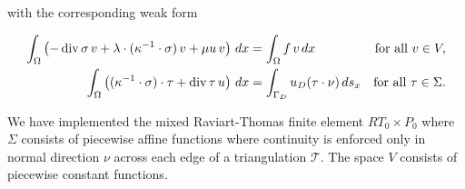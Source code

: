 with the corresponding weak form

\begin{align}
\label{sect:FEMForEllipticProblems.eq.mixedWeakForm}
  \int_\Omega \left( -\operatorname{div}\sigma\,v + \lambda\cdot(\kappa^{-1}\cdot\sigma)\,v + \mu u\,v\right)\,dx &= \int_\Omega f\,v\,dx &\text{for all } v\in V, \\
  \int_\Omega \left((\kappa^{-1}\cdot\sigma)\cdot\tau + \operatorname{div}\tau\, u\right)\,dx &= \int_{\Gamma_D} u_D(\tau\cdot\nu)\,ds_x &\text{for all } \tau\in\Sigma.
\end{align}

\bigskip

We have implemented the mixed Raviart-Thomas finite element $RT_0\times P_0$ where $\Sigma$ consists of piecewise affine functions where continuity is enforced only in normal direction $\nu$ across each edge of a triangulation $\mathcal{T}$. The space $V$ consists of piecewise constant functions.
